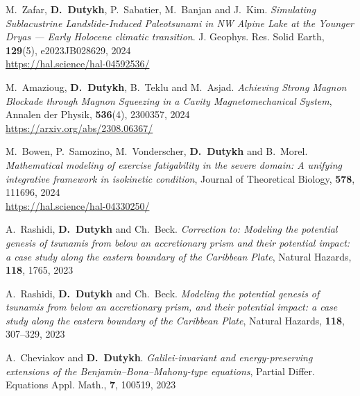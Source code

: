 \begin{etaremune}
  \item M.~Zafar, \textbf{D.~Dutykh}, P.~Sabatier, M.~Banjan and J.~Kim. \textit{Simulating Sublacustrine Landslide-Induced Paleotsunami in NW Alpine Lake at the Younger Dryas --- Early Holocene climatic transition}. J. Geophys. Res. Solid Earth, \textbf{129}(5), e2023JB028629, 2024 \\ %
  \url{https://hal.science/hal-04592536/}
  
  \item M.~Amazioug, \textbf{D.~Dutykh}, B.~Teklu and M.~Asjad. \textit{Achieving Strong Magnon Blockade through Magnon Squeezing in a Cavity Magnetomechanical System}, Annalen der Physik, \textbf{536}(4), 2300357, 2024 \\ %
  \url{https://arxiv.org/abs/2308.06367/}
  
  \item M.~Bowen, P.~Samozino, M.~Vonderscher, \textbf{D.~Dutykh} and B.~Morel. \textit{Mathematical modeling of exercise fatigability in the severe domain: A unifying integrative framework in isokinetic condition}, Journal of Theoretical Biology, \textbf{578}, 111696, 2024 \\ %
  \url{https://hal.science/hal-04330250/}
  
  

  \item A.~Rashidi, \textbf{D.~Dutykh} and Ch.~Beck. \textit{Correction to: Modeling the potential genesis of tsunamis from below an accretionary prism and their potential impact: a case study along the eastern boundary of the Caribbean Plate}, Natural Hazards, \textbf{118}, 1765, 2023 %
  
  \item A.~Rashidi, \textbf{D.~Dutykh} and Ch.~Beck. \textit{Modeling the potential genesis of tsunamis from below an accretionary prism, and their potential impact: a case study along the eastern boundary of the Caribbean Plate}, Natural Hazards, \textbf{118}, 307--329, 2023 %

  \item A.~Cheviakov and \textbf{D.~Dutykh}. \textit{Galilei-invariant and energy-preserving extensions of the Benjamin--Bona--Mahony-type equations}, Partial Differ. Equations Appl. Math., \textbf{7}, 100519, 2023 %


\end{etaremune}
